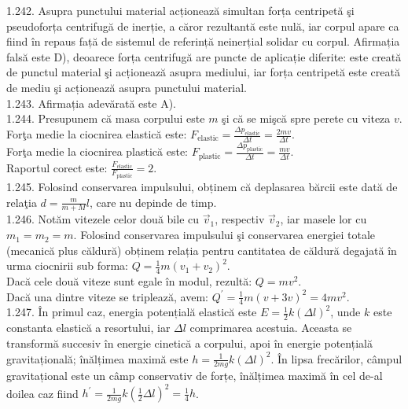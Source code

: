 1.242. Asupra punctului material acționează simultan forța centripetă şi pseudoforța centrifugă de inerție, a căror rezultantă este nulă, iar corpul apare ca fiind în repaus față de sistemul de referință neinerțial solidar cu corpul. Afirmația falsă este D), deoarece forța centrifugă are puncte de aplicație diferite: este creată de punctul material şi acționează asupra mediului, iar forța centripetă este creată de mediu şi acționează asupra punctului material.\\

1.243. Afirmația adevărată este A).\\

1.244. Presupunem că masa corpului este $m$ şi că se mişcă spre perete cu viteza $v$.\\ Forţa medie la ciocnirea elastică este: $F_{\text {elastic}}=\frac{\Delta p_{\text {elastic}}}{\Delta t}=\frac{2 m v}{\Delta t}$.\\ Forţa medie la ciocnirea plastică este: $F_{\text {plastic}}=\frac{\Delta p_{\text {plastic}}}{\Delta t}=\frac{m v}{\Delta t}$.\\ Raportul corect este: $\frac{F_{\text {elastic}}}{F_{\text {plastic}}}=2$.\\

1.245. Folosind conservarea impulsului, obținem că deplasarea bărcii este dată de relaţia $d=\frac{m}{m+M} l$, care nu depinde de timp.\\

1.246. Notăm vitezele celor două bile cu $\vec{v}_{1}$, respectiv $\vec{v}_{2}$, iar masele lor cu $m_{1}=m_{2}=m$. Folosind conservarea impulsului şi conservarea energiei totale (mecanică plus căldură) obținem relația pentru cantitatea de căldură degajată în urma ciocnirii sub forma: $Q=\frac{1}{4} m\left(v_{1}+v_{2}\right)^{2}$.\\ Dacă cele două viteze sunt egale în modul, rezultă: $Q=m v^{2}$.\\ Dacă una dintre viteze se triplează, avem: $Q^{\prime}=\frac{1}{4} m(v+3 v)^{2}=4 m v^{2}$.\\

1.247. În primul caz, energia potențială elastică este $E=\frac{1}{2} k(\Delta l)^{2}$, unde $k$ este constanta elastică a resortului, iar $\Delta l$ comprimarea acestuia. Aceasta se transformă succesiv în energie cinetică a corpului, apoi în energie potențială gravitațională; înălțimea maximă este $h=\frac{1}{2 m g} k(\Delta l)^{2}$. În lipsa frecărilor, câmpul gravitațional este un câmp conservativ de forțe, înălțimea maximă în cel de-al doilea caz fiind $h^{\prime}=\frac{1}{2 m g} k\left(\frac{1}{2} \Delta l\right)^{2}=\frac{1}{4} h$.\\

